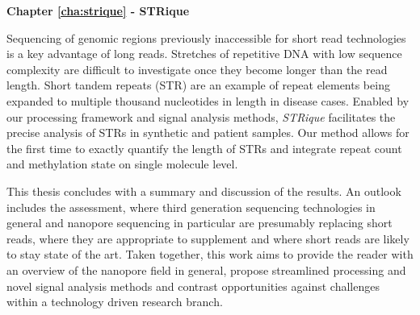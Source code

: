 \textbf{Chapter \ref{cha:strique} - STRique}

Sequencing of genomic regions previously inaccessible for short read technologies is a key advantage of long reads.
Stretches of repetitive DNA with low sequence complexity are difficult to investigate once they become longer than the read length.
Short tandem repeats (STR) are an example of repeat elements being expanded to multiple thousand nucleotides in length in disease cases.
Enabled by our processing framework and signal analysis methods, \textit{STRique} facilitates the precise analysis of STRs in synthetic and patient samples.
Our method allows for the first time to exactly quantify the length of STRs and integrate repeat count and methylation state on single molecule level.


This thesis concludes with a summary and discussion of the results.
An outlook includes the assessment, where third generation sequencing technologies in general and nanopore sequencing in particular are presumably replacing short reads, where they are appropriate to supplement and where short reads are likely to stay state of the art.
Taken together, this work aims to provide the reader with an overview of the nanopore field in general, propose streamlined processing and novel signal analysis methods and contrast opportunities against challenges within a technology driven research branch.







